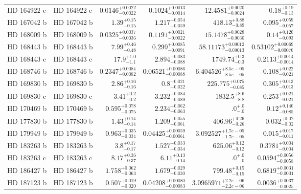 \begin{longtable*}{llrrrr}
HD 164922 e & HD 164922 e & $0.0146^{+0.0022}_{-0.0022}$ & $0.1024^{+0.0013}_{-0.0014}$ & $12.4581^{+0.0020}_{-0.0024}$ & $0.18^{+0.19}_{-0.13}$ \\ 
HD 167042 b & HD 167042 b & $1.39^{+0.15}_{-0.15}$ & $1.217^{+0.054}_{-0.059}$ & $418.13^{+0.88}_{-0.89}$ & $0.095^{+0.059}_{-0.057}$ \\ 
HD 168009 b & HD 168009 b & $0.0325^{+0.0037}_{-0.0036}$ & $0.1191^{+0.0021}_{-0.0022}$ & $15.1478^{+0.0028}_{-0.0030}$ & $0.14^{+0.120}_{-0.093}$ \\ 
HD 168443 b & HD 168443 b & $7.99^{+0.46}_{-0.48}$ & $0.299^{+0.0085}_{-0.0091}$ & $58.11173^{+0.00012}_{-0.00013}$ & $0.53102^{+0.00069}_{-0.00070}$ \\ 
HD 168443 c & HD 168443 c & $17.9^{+1.0}_{-1.1}$ & $2.894^{+0.083}_{-0.088}$ & $1749.74^{+0.3}_{-0.3}$ & $0.2113^{+0.0014}_{-0.0014}$ \\ 
HD 168746 b & HD 168746 b & $0.2347^{+0.0084}_{-0.0082}$ & $0.06521^{+0.00086}_{-0.00088}$ & $6.404526^{+8.5e-05}_{-8.5e-05}$ & $0.108^{+0.022}_{-0.021}$ \\ 
HD 169830 b & HD 169830 b & $2.86^{+0.16}_{-0.16}$ & $0.8^{+0.021}_{-0.022}$ & $225.775^{+0.075}_{-0.085}$ & $0.305^{+0.013}_{-0.013}$ \\ 
HD 169830 c & HD 169830 c & $3.41^{+0.2}_{-0.2}$ & $3.232^{+0.084}_{-0.089}$ & $1832.5^{+8.6}_{-8.8}$ & $0.253^{+0.021}_{-0.021}$ \\ 
HD 170469 b & HD 170469 b & $0.595^{+0.078}_{-0.075}$ & $2.234^{+0.062}_{-0.063}$ & $.0^{+.0}_{-.0}$ & $0.12^{+0.140}_{-0.085}$ \\ 
HD 177830 b & HD 177830 b & $1.43^{+0.14}_{-0.14}$ & $1.209^{+0.055}_{-0.061}$ & $406.96^{+0.26}_{-0.26}$ & $0.032^{+0.02}_{-0.02}$ \\ 
HD 179949 b & HD 179949 b & $0.963^{+0.035}_{-0.034}$ & $0.04425^{+0.00059}_{-0.00061}$ & $3.092527^{+1.7e-05}_{-1.7e-05}$ & $0.015^{+0.017}_{-0.011}$ \\ 
HD 183263 b & HD 183263 b & $3.8^{+0.17}_{-0.17}$ & $1.527^{+0.033}_{-0.034}$ & $625.06^{+0.12}_{-0.12}$ & $0.3781^{+0.004}_{-0.004}$ \\ 
HD 183263 c & HD 183263 c & $8.17^{+0.36}_{-0.37}$ & $6.11^{+0.13}_{-0.14}$ & $.0^{+.0}_{-.0}$ & $0.0594^{+0.0056}_{-0.0058}$ \\ 
HD 186427 b & HD 186427 b & $1.758^{+0.062}_{-0.063}$ & $1.679^{+0.029}_{-0.030}$ & $799.48^{+0.15}_{-0.15}$ & $0.6819^{+0.0031}_{-0.0031}$ \\ 
HD 187123 b & HD 187123 b & $0.507^{+0.019}_{-0.020}$ & $0.04208^{+0.00080}_{-0.00083}$ & $3.0965971^{+2.2e-06}_{-2.2e-06}$ & $0.0036^{+0.0037}_{-0.0025}$ \\ 

\end{longtable*}
